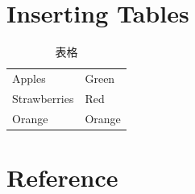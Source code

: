\documentclass[a4paper, 12pt]{article}
\begin{document}
\newpage
\section{Inserting Tables}
 \begin{table}[h]
  \centering
  \begin{tabular}{|l|l|}
  Apples       & Green  \\
  Strawberries & Red    \\
  Orange       & Orange \\
  \end{tabular}
 \label{Table}
 \caption{表格}
 \end{table}

\section{Reference}
  
  
\end{document}
